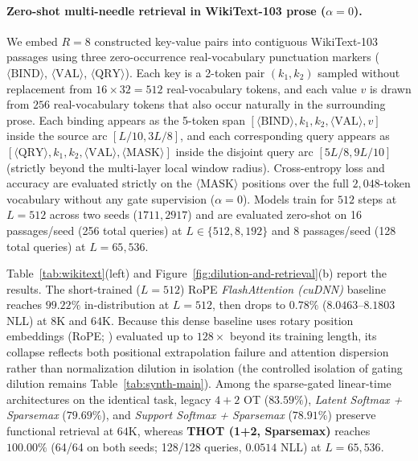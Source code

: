\documentclass[11pt]{article}
\begin{document}
\paragraph{Zero-shot multi-needle retrieval in WikiText-103 prose (\texorpdfstring{$\alpha=0$}{alpha=0}).}
We embed $R=8$ constructed key-value pairs into contiguous WikiText-103 passages using three zero-occurrence real-vocabulary punctuation markers ($\langle\text{BIND}\rangle$, $\langle\text{VAL}\rangle$, $\langle\text{QRY}\rangle$). Each key is a 2-token pair $(k_1, k_2)$ sampled without replacement from $16 \times 32 = 512$ real-vocabulary tokens, and each value $v$ is drawn from $256$ real-vocabulary tokens that also occur naturally in the surrounding prose. Each binding appears as the 5-token span $[\langle\text{BIND}\rangle, k_1, k_2, \langle\text{VAL}\rangle, v]$ inside the source arc $[L/10, 3L/8]$, and each corresponding query appears as $[\langle\text{QRY}\rangle, k_1, k_2, \langle\text{VAL}\rangle, \langle\text{MASK}\rangle]$ inside the disjoint query arc $[5L/8, 9L/10]$ (strictly beyond the multi-layer local window radius). Cross-entropy loss and accuracy are evaluated strictly on the $\langle\text{MASK}\rangle$ positions over the full $2{,}048$-token vocabulary without any gate supervision ($\alpha=0$). Models train for $512$ steps at $L=512$ across two seeds ($1711, 2917$) and are evaluated zero-shot on 16 passages/seed (256 total queries) at $L \in \{512, 8{,}192\}$ and 8 passages/seed (128 total queries) at $L=65{,}536$.

Table~\ref{tab:wikitext}(left) and Figure~\ref{fig:dilution-and-retrieval}(b) report the results. The short-trained ($L=512$) RoPE \emph{FlashAttention (cuDNN)} baseline reaches $99.22\%$ in-distribution at $L=512$, then drops to $0.78\%$ ($8.0463$--$8.1803$ NLL) at $8\text{K}$ and $64\text{K}$. Because this dense baseline uses rotary position embeddings (RoPE; \citealp{su2024roformer}) evaluated up to $128\times$ beyond its training length, its collapse reflects both positional extrapolation failure and attention dispersion rather than normalization dilution in isolation (the controlled isolation of gating dilution remains Table~\ref{tab:synth-main}). Among the sparse-gated linear-time architectures on the identical task, legacy $4+2$ OT ($83.59\%$), \emph{Latent Softmax + Sparsemax} ($79.69\%$), and \emph{Support Softmax + Sparsemax} ($78.91\%$) preserve functional retrieval at $64\text{K}$, whereas \textbf{THOT (1+2, Sparsemax)} reaches \textbf{$100.00\%$} (64/64 on both seeds; 128/128 queries, $0.0514$ NLL) at $L=65{,}536$.
\end{document}
